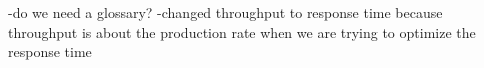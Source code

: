 -do we need a glossary?
-changed throughput to response time because throughput is about the production rate when we are trying to optimize the response time